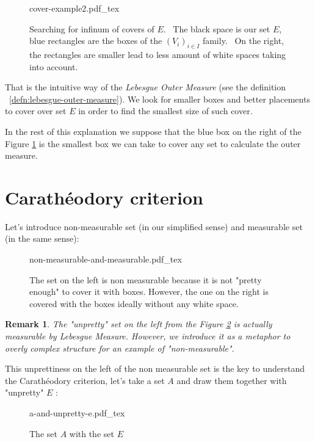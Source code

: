 \documentclass[a4paper]{article}
\newcommand{\incfig}[1]{%
    \def\svgwidth{\columnwidth}
    {#1.pdf_tex}
}
\newtheorem*{remark}{Remark}
\begin{document}
\begin{figure}[H]
    \centering
    \incfig{cover-example2}
    \caption{Searching for infinum of covers of $E$. \
        The black space is our
        set $E$, blue rectangles are the boxes of the  $(V_i)_{i \in I}$
        family. \
        On the right, the rectangles are smaller lead to less amount of white spaces taking into account.}
    \label{fig:cover-example2}
\end{figure}

That is the intuitive way of the \textit{Lebesgue Outer Measure} (see the
definition ~\ref{defn:lebesgue-outer-measure}). We look for smaller boxes and
better placements to cover over set $E$ in order to find the smallest size of
such cover.

In the rest of this explanation we suppose that the blue box on the right of
the Figure \ref{fig:cover-example2} is the smallest box we can take to cover any set
to calculate the outer measure.

\section{Carathéodory criterion}
Let's introduce non-measurable set (in our simplified
sense) and measurable set (in the same sense):
\begin{figure}[H]
    \centering
    \incfig{non-measurable-and-measurable}
    \caption{The set on the left is non measurable because it is not "pretty
    enough" to cover it with boxes. However, the one on the right is covered
with the boxes ideally without any white space.}
    \label{fig:non-measurable-and-measurable}
\end{figure}

\begin{remark}
    The "unpretty" set on the left from the Figure
    \ref{fig:non-measurable-and-measurable} is actually measurable by Lebesgue
    Measure. However, we introduce it as a metaphor to overly complex structure 
    for an example of "non-measurable".
\end{remark}

This unprettiness on the left of the non measurable set is the key to
understand the Carathéodory criterion, let's take a set $A$ and draw them
together with "unpretty" $E$ :

\begin{figure}[H]
    \centering
    \incfig{a-and-unpretty-e}
    \caption{The set $A$ with the set  $E$}
    \label{fig:a-and-unpretty-e}
\end{figure}
\end{document}
